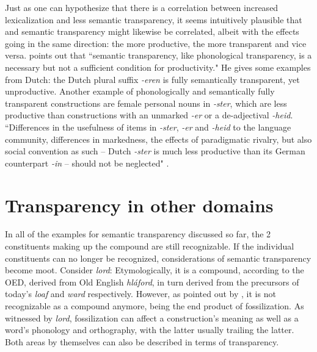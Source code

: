 Just as one can hypothesize that there is a correlation between increased
lexicalization and less semantic transparency, it seems intuitively
plausible that  and semantic transparency might likewise be
correlated, albeit with the effects going in the same direction: the
more productive, the more transparent and vice
versa. 
\citet[199]{Baayen:1993} points out that ``semantic
transparency, like phonological transparency, is a necessary but not a
sufficient condition for productivity." He gives some examples from
Dutch: the Dutch plural suffix \emph{-eren} is fully semantically
transparent, yet unproductive. Another example of phonologically
and semantically fully transparent constructions are female personal
nouns in \emph{-ster}, which are less productive than constructions
with an unmarked \emph{-er} or a de-adjectival
\emph{-heid}. ``Differences in the usefulness of items in
\emph{-ster}, \emph{-er} and \emph{-heid} to the language community,
differences in markedness, the effects of paradigmatic rivalry, but
also social convention as such -- Dutch \emph{-ster} is much less
productive than its German counterpart \emph{-in} -- should not be
neglected" \citep[199--200]{Baayen:1993}.  

\section{Transparency in other domains} %
\label{sec:transparency-other-dimensions}

In all of the examples for semantic transparency discussed so far, the 2 constituents making up the
compound are still recognizable. If the individual constituents can no longer
be recognized, considerations of semantic transparency become
moot. Consider \emph{lord}: Etymologically, it is a compound, according to the OED, derived from Old English
\emph{hláford}, in turn derived from the precursors of today's \emph{loaf} and
\emph{ward} respectively. However, as pointed out by \citet[40]{Dressler:2006}, it is not
recognizable as a compound anymore, being the end product of
fossilization. As witnessed by \emph{lord}, fossilization can affect a
construction's meaning as well as
a word's phonology and orthography, with the
latter usually trailing the latter. Both areas by themselves can also be described
in terms of transparency. 

